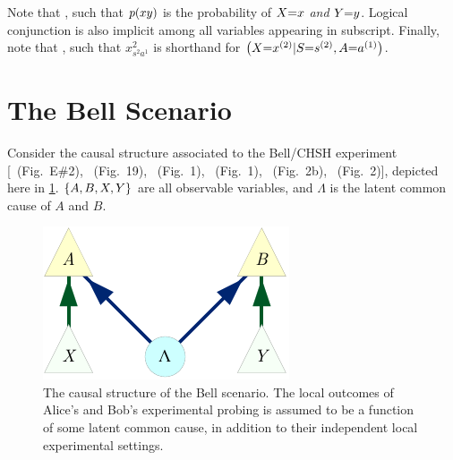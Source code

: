 Note that , such that $\p{x y}$ is the probability of $X\cramp{=}x$ \emph{and} $Y\cramp{=}y$. Logical conjunction is also implicit among all variables appearing in subscript.
Finally, note that , such that $x^2_{s^2 a^1}$ is shorthand for $\parens*{X\cramp{=}x^{(2)}|S\cramp{=}s^{(2)},A\cramp{=}a^{(1)}}$. 



\section{The Bell Scenario}

Consider the causal structure associated to the Bell/CHSH \cite{bell1964einstein,Brunner2013Bell,bell1966lhvm,CHSHOriginal} experiment [\citealp{pusey2014gdag}~(Fig.~E\#2), \citealp{WoodSpekkens}~(Fig.~19), \citealp{chaves2014novel}~(Fig.~1), \citealp{BeyondBellII}~(Fig.~1), \citealp{wolfe2015nonconvexity}~(Fig.~2b), \citealp{steeg2011relaxation}~(Fig.~2)], depicted here in \cref{fig:NewBellDAG}. $\brackets{A,B,X,Y}$ are all observable variables, and $\Lambda$ is the latent common cause of $A$ and $B$.

\begin{figure}[H]
\centering
\includegraphics[scale=1]{NewBellDAG.pdf}
\caption{The causal structure of the Bell scenario. The local outcomes of Alice's and Bob's experimental probing is assumed to be a function of some latent common cause, in addition to their independent local experimental settings.}\label{fig:NewBellDAG}
\end{figure}


